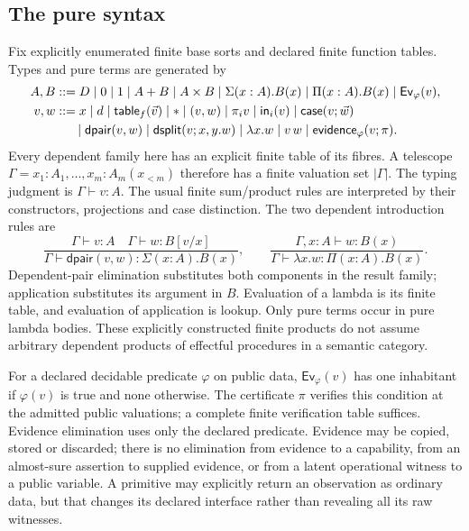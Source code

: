 \documentclass[11pt,a4paper]{article}
\theoremstyle{definition}
\newcommand{\Ev}{\mathsf{Ev}}
\begin{document}
\subsection{The pure syntax}
Fix explicitly enumerated finite base sorts and declared finite function
tables. Types and pure terms are generated by
\[
\begin{split}
 A,B &::= D\mid 0\mid 1\mid A+B\mid A\times B
       \mid\Sigma(x:A).B(x)\mid\Pi(x:A).B(x)\mid\Ev_\varphi(v),\\
 v,w &::= x\mid d\mid\mathsf{table}_f(\vec v)\mid *
       \mid(v,w)\mid\pi_i v\mid\mathsf{in}_i(v)
       \mid\mathsf{case}(v;\vec w)\\
     &\hspace{1.5em}\mid\mathsf{dpair}(v,w)\mid\mathsf{dsplit}(v;x,y.w)
       \mid\lambda x.w\mid v\,w\mid\mathsf{evidence}_\varphi(v;\pi).
\end{split}
\]
Every dependent family here has an explicit finite table of its fibres.
A telescope $\Gamma=x_1:A_1,\ldots,x_m:A_m(x_{<m})$ therefore has a finite
valuation set $|\Gamma|$. The typing judgment is $\Gamma\vdash v:A$.
The usual finite sum/product rules are interpreted by their constructors,
projections and case distinction. The two dependent introduction rules are
\[
 \frac{\Gamma\vdash v:A\quad\Gamma\vdash w:B[v/x]}
 {\Gamma\vdash\mathsf{dpair}(v,w):\Sigma(x:A).B(x)},
 \qquad
 \frac{\Gamma,x:A\vdash w:B(x)}
 {\Gamma\vdash\lambda x.w:\Pi(x:A).B(x)}.
\]
Dependent-pair elimination substitutes both components in the result
family; application substitutes its argument in $B$. Evaluation of a
lambda is its finite table, and evaluation of application is lookup.
Only pure terms occur in pure lambda bodies. These explicitly constructed
finite products do not assume arbitrary dependent products of effectful
procedures in a semantic category.

For a declared decidable predicate $\varphi$ on public data,
$\Ev_\varphi(v)$ has one inhabitant if $\varphi(v)$ is true and none
otherwise. The certificate $\pi$ verifies this condition at the admitted
public valuations; a complete finite verification table suffices.
Evidence elimination uses only the declared predicate. Evidence may be
copied, stored or discarded; there is no elimination from evidence to a
capability, from an almost-sure assertion to supplied evidence, or from a
latent operational witness to a public variable. A primitive may explicitly
return an observation as ordinary data, but that changes its declared
interface rather than revealing all its raw witnesses.
\end{document}
